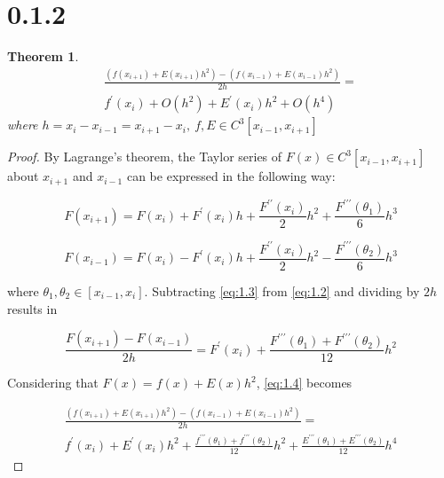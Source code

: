 \documentclass[a4paper]{amsproc}
\theoremstyle{plain}
\newtheorem*{thm}{Theorem}
\theoremstyle{definition}
\theoremstyle{remark}
\numberwithin{equation}{section}
\begin{document}
\section*{0.1.2}

\begin{thm} \label{some label} %
\begin{multline}
\label{eq:1.1} \frac{(f(x_{i+1})+E(x_{i+1})h^2)-(f(x_{i-1})+E(x_{i-1})h^2)}{2h} = \\ f^{\prime}(x_i)+O(h^2)+E^{\prime}(x_i)h^2+O(h^4) \end{multline} 
where $ h=x_i-x_{i-1}=x_{i+1}-x_{i}, ~ f,E \in C^3[x_{i-1}, x_{i+1}]$ 
\end{thm}

\begin{proof}
By Lagrange's theorem, the Taylor series of $F(x) \in C^3[x_{i-1}, x_{i+1}]$ about $x_{i+1}$ and $x_{i-1}$ can be expressed in the following way:

\begin{equation}\label{eq:1.2}
F(x_{i+1})=F(x_i)+F^{\prime}(x_i)h+\frac{F^{\prime \prime}(x_{i})}{2}h^2+\frac{F^{\prime \prime \prime}(\theta_1)}{6}h^3
\end{equation}

\begin{equation}\label{eq:1.3}
F(x_{i-1})=F(x_i)-F^{\prime}(x_i)h+\frac{F^{\prime \prime}(x_{i})}{2}h^2-\frac{F^{\prime \prime \prime}(\theta_2)}{6}h^3
\end{equation}

where $\theta_1, \theta_2 \in [x_{i-1}, x_i]$. Subtracting \eqref{eq:1.3} from \eqref{eq:1.2} and dividing by $2h$ results in 

\begin{equation}\label{eq:1.4}
\frac{F(x_{i+1})-F(x_{i-1})}{2h}=F^{\prime}(x_i)+\frac{F^{\prime \prime \prime}(\theta_1)+F^{\prime \prime \prime}(\theta_2)}{12}h^2
\end{equation}

Considering that $F(x) = f(x) + E(x)h^2$, \eqref{eq:1.4} becomes 

\begin{multline}\label{eq:1.5}
\frac{(f(x_{i+1})+E(x_{i+1})h^2)-(f(x_{i-1})+E(x_{i-1})h^2)}{2h}= \\ 
f^{\prime}(x_i)+E^{\prime}(x_i)h^2+\frac{f^{\prime \prime \prime}(\theta_1)+f^{\prime \prime \prime}(\theta_2)}{12}h^2+\frac{E^{\prime \prime \prime}(\theta_1)+E^{\prime \prime \prime}(\theta_2)}{12}h^4
\end{multline}


\end{proof}
\end{document}
